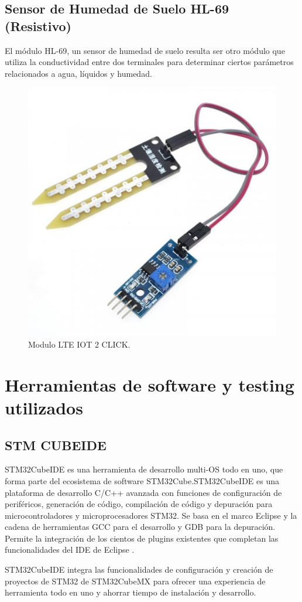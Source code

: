 \subsection{Sensor de Humedad de Suelo HL-69 (Resistivo)}
El módulo HL-69, un sensor de humedad de suelo resulta ser otro módulo que utiliza la conductividad entre dos terminales para determinar ciertos parámetros relacionados a agua, líquidos y humedad.
\begin{figure}[htbp]
	\centering
	\includegraphics[width=.4\textwidth]{./Figures/sensordehumedad.jpg}
	\caption{Modulo LTE IOT 2 CLICK.}
\end{figure}

\section{Herramientas de software y testing utilizados}
\subsection{STM CUBEIDE}
STM32CubeIDE es una herramienta de desarrollo multi-OS todo en uno, que forma parte del ecosistema de software STM32Cube.STM32CubeIDE es una plataforma de desarrollo C/C++ avanzada con funciones de configuración de periféricos, generación de código, compilación de código y depuración para microcontroladores y microprocesadores STM32. Se basa en el marco Eclipse  y la cadena de herramientas GCC para el desarrollo y GDB para la depuración. Permite la integración de los cientos de plugins existentes que completan las funcionalidades del IDE de Eclipse .

STM32CubeIDE integra las funcionalidades de configuración y creación de proyectos de STM32 de STM32CubeMX para ofrecer una experiencia de herramienta todo en uno y ahorrar tiempo de instalación y desarrollo.

